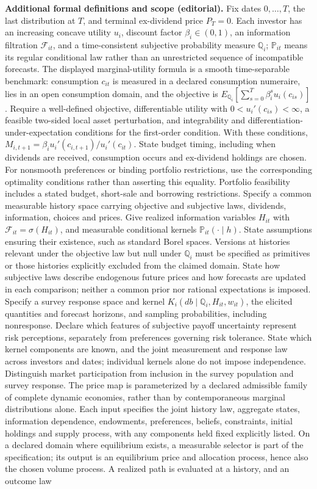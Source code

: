 \documentclass[11pt,a4paper]{article}
\begin{document}
\textbf{Additional formal definitions and scope (editorial).} Fix dates \(0,\ldots,T\), the last distribution at \(T\), and terminal ex-dividend price \(P_T=0\). Each investor has an increasing concave utility \(u_i\), discount factor \(\beta_i\in(0,1)\), an information filtration \(\mathcal F_{it}\), and a time-consistent subjective probability measure \(\mathbb Q_i\); \(\mathbb P_{it}\) means its regular conditional law rather than an unrestricted sequence of incompatible forecasts. The displayed marginal-utility formula is a smooth time-separable benchmark: consumption \(c_{it}\) is measured in a declared consumption numeraire, lies in an open consumption domain, and the objective is \(E_{\mathbb Q_i}[\sum_{s=0}^T\beta_i^s u_i(c_{is})]\). Require a well-defined objective, differentiable utility with \(0<u_i'(c_{is})<\infty\), a feasible two-sided local asset perturbation, and integrability and differentiation-under-expectation conditions for the first-order condition. With these conditions, \(M_{i,t+1}=\beta_i u_i'(c_{i,t+1})/u_i'(c_{it})\). State budget timing, including when dividends are received, consumption occurs and ex-dividend holdings are chosen. For nonsmooth preferences or binding portfolio restrictions, use the corresponding optimality conditions rather than asserting this equality. Portfolio feasibility includes a stated budget, short-sale and borrowing restrictions. Specify a common measurable history space carrying objective and subjective laws, dividends, information, choices and prices. Give realized information variables \(H_{it}\) with \(\mathcal F_{it}=\sigma(H_{it})\), and measurable conditional kernels \(\mathbb P_{it}(\cdot\mid h)\). State assumptions ensuring their existence, such as standard Borel spaces. Versions at histories relevant under the objective law but null under \(\mathbb Q_i\) must be specified as primitives or those histories explicitly excluded from the claimed domain. State how subjective laws describe endogenous future prices and how forecasts are updated in each comparison; neither a common prior nor rational expectations is imposed. Specify a survey response space and kernel \(K_i(db\mid\mathbb Q_i,H_{it},w_{it})\), the elicited quantities and forecast horizons, and sampling probabilities, including nonresponse. Declare which features of subjective payoff uncertainty represent risk perceptions, separately from preferences governing risk tolerance. State which kernel components are known, and the joint measurement and response law across investors and dates; individual kernels alone do not impose independence. Distinguish market participation from inclusion in the survey population and survey response. The price map is parameterized by a declared admissible family of complete dynamic economies, rather than by contemporaneous marginal distributions alone. Each input specifies the joint history law, aggregate states, information dependence, endowments, preferences, beliefs, constraints, initial holdings and supply process, with any components held fixed explicitly listed. On a declared domain where equilibrium exists, a measurable selector is part of the specification; its output is an equilibrium price and allocation process, hence also the chosen volume process. A realized path is evaluated at a history, and an outcome law 
\end{document}
